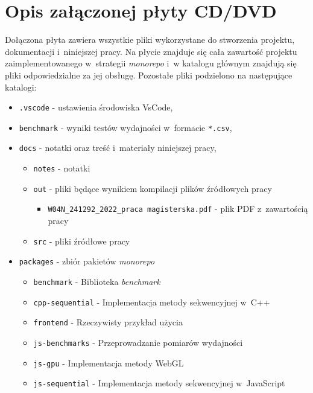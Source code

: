 \chapter{Opis załączonej płyty CD/DVD}
Dołączona płyta zawiera wszystkie pliki wykorzystane do stworzenia projektu, dokumentacji i~niniejszej pracy. Na płycie znajduje się cała zawartość projektu zaimplementowanego w~strategii \textit{monorepo} i~w katalogu głównym znajdują się pliki odpowiedzialne za jej obsługę.  Pozostałe pliki podzielono na następujące katalogi:

\begin{itemize}
    \item \texttt{.vscode} - ustawienia środowiska VsCode,
    \item \texttt{benchmark} - wyniki testów wydajności w~formacie \texttt{*.csv},
    \item \texttt{docs} - notatki oraz treść i~materiały niniejszej pracy,
    \begin{itemize}[topsep=0pt]
        \item[\textbullet] \texttt{notes} - notatki
        \item[\textbullet] \texttt{out} - pliki będące wynikiem kompilacji plików źródłowych pracy
        \begin{itemize}[topsep=0pt]
            \item[\textbullet] \texttt{W04N\_241292\_2022\_praca magisterska.pdf} - plik PDF z~zawartością pracy
        \end{itemize}
        \item[\textbullet] \texttt{src} - pliki źródłowe pracy
    \end{itemize} 
    \item \texttt{packages} - zbiór pakietów \textit{monorepo}
    \begin{itemize}[topsep=0pt]
        \item[\textbullet] \texttt{benchmark} - Biblioteka \textit{benchmark}
        \item[\textbullet] \texttt{cpp-sequential} - Implementacja metody sekwencyjnej w~C++
        \item[\textbullet] \texttt{frontend} - Rzeczywisty przykład użycia
        \item[\textbullet] \texttt{js-benchmarks} - Przeprowadzanie pomiarów wydajności
        \item[\textbullet] \texttt{js-gpu} - Implementacja metody WebGL
        \item[\textbullet] \texttt{js-sequential} - Implementacja metody sekwencyjnej w~JavaScript

\end{itemize}
\end{itemize}
